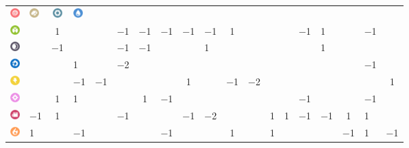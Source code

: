 \begin{table}[ht]
\begin{center}
\begin{tabular}{c g c g c g c g c g c g c g c g c g c}
  \includegraphics[width=1em]{images/psychic.png} &
  \includegraphics[width=1em]{images/rock.png} &
  \includegraphics[width=1em]{images/steel.png} &
  \includegraphics[width=1em]{images/water.png}
    \\
    \includegraphics[width=1em]{images/bug.png} & & 1 & & & −1 & −1 & −1 & −1 & −1 & 1 & & & & −1 & 1 & & −1 & \\ %
    \includegraphics[width=1em]{images/dark.png} & & −1 & & & −1 & −1 & & & 1 & & & & & & 1 & & & \\ %
    \includegraphics[width=1em]{images/dragon.png} & & & 1 & & −2 & & & & & & & & & & & & −1 & \\ %
    \includegraphics[width=1em]{images/electric.png} & & & −1 & −1 & & & & 1 & & −1 & −2 & & & & & & & 1 \\ %
    \includegraphics[width=1em]{images/fairy.png} & & 1 & 1 & & & 1 & −1 & & & & & & & −1 & & & −1 & \\ %
    \includegraphics[width=1em]{images/fighting.png} & −1 & 1 & & & −1 & & & −1 & −2 & & & 1 & 1 & −1 & −1 & 1 & 1 & \\ %
    \includegraphics[width=1em]{images/fire.png} & 1 & & −1 & & & & −1 & & & 1 & & 1 & & & & −1 & 1 & −1 \\ %

\end{tabular}
\end{center}
\end{table}
